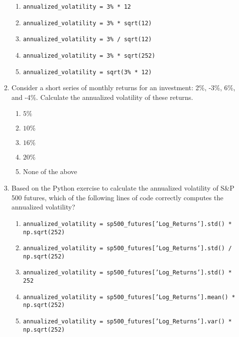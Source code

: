 \documentclass{article}
\begin{document}
\begin{enumerate}
    \begin{enumerate}
        \item \texttt{annualized\_volatility = 3\% * 12}
        \item \texttt{annualized\_volatility = 3\% * sqrt(12)}
        \item \texttt{annualized\_volatility = 3\% / sqrt(12)}
        \item \texttt{annualized\_volatility = 3\% * sqrt(252)}
        \item \texttt{annualized\_volatility = sqrt(3\% * 12)}
    \end{enumerate}

    \item Consider a short series of monthly returns for an investment: 2\%, -3\%, 6\%, and -4\%. Calculate the annualized volatility of these returns.
    \begin{enumerate}
        \item \(5\%\)
        \item \(10\%\)
        \item \(16\%\)
        \item \(20\%\)
        \item None of the above
    \end{enumerate}

    \item Based on the Python exercise to calculate the annualized volatility of S\&P 500 futures, which of the following lines of code correctly computes the annualized volatility?
    \begin{enumerate}
        \item \texttt{annualized\_volatility = sp500\_futures['Log\_Returns'].std() * np.sqrt(252)}
        \item \texttt{annualized\_volatility = sp500\_futures['Log\_Returns'].std() / np.sqrt(252)}
        \item \texttt{annualized\_volatility = sp500\_futures['Log\_Returns'].std() * 252}
        \item \texttt{annualized\_volatility = sp500\_futures['Log\_Returns'].mean() * np.sqrt(252)}
        \item \texttt{annualized\_volatility = sp500\_futures['Log\_Returns'].var() * np.sqrt(252)}
    \end{enumerate}


\end{enumerate}
\end{document}
